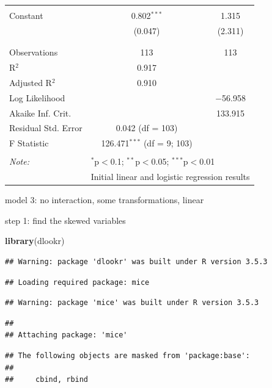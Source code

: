 \documentclass[
]{article}
\newenvironment{Shaded}{\begin{snugshade}}{\end{snugshade}}
\newcommand{\KeywordTok}[1]{\textcolor[rgb]{0.13,0.29,0.53}{\textbf{#1}}}
\newcommand{\NormalTok}[1]{#1}
\begin{document}
\begin{table}[!htbp]
\begin{tabular}{@{\extracolsep{5pt}}lcc}
  & & \\ 
 Constant & 0.802$^{***}$ & 1.315 \\ 
  & (0.047) & (2.311) \\ 
  & & \\ 
\hline \\[-1.8ex] 
Observations & 113 & 113 \\ 
R$^{2}$ & 0.917 &  \\ 
Adjusted R$^{2}$ & 0.910 &  \\ 
Log Likelihood &  & $-$56.958 \\ 
Akaike Inf. Crit. &  & 133.915 \\ 
Residual Std. Error & 0.042 (df = 103) &  \\ 
F Statistic & 126.471$^{***}$ (df = 9; 103) &  \\ 
\hline 
\hline \\[-1.8ex] 
\textit{Note:}  & \multicolumn{2}{l}{$^{*}$p$<$0.1; $^{**}$p$<$0.05; $^{***}$p$<$0.01} \\ 
 & \multicolumn{2}{l}{Initial linear and logistic regression results} \\ 
\end{tabular} 
\end{table}

model 3: no interaction, some transformations, linear

step 1: find the skewed variables

\begin{Shaded}
\begin{Highlighting}[]
\KeywordTok{library}\NormalTok{(dlookr)}
\end{Highlighting}
\end{Shaded}

\begin{verbatim}
## Warning: package 'dlookr' was built under R version 3.5.3
\end{verbatim}

\begin{verbatim}
## Loading required package: mice
\end{verbatim}

\begin{verbatim}
## Warning: package 'mice' was built under R version 3.5.3
\end{verbatim}

\begin{verbatim}
## 
## Attaching package: 'mice'
\end{verbatim}

\begin{verbatim}
## The following objects are masked from 'package:base':
## 
##     cbind, rbind
\end{verbatim}
\end{document}
